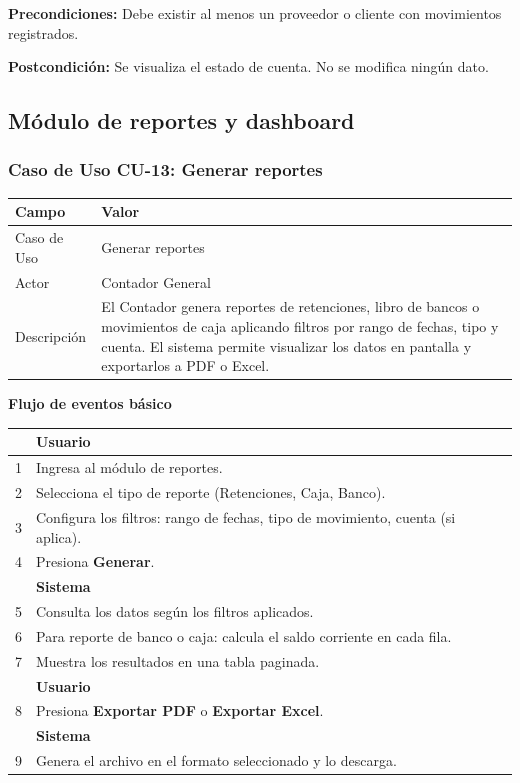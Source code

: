 \documentclass[stu]{apa7}
\begin{document}
\vspace{0.3cm}

\textbf{Precondiciones:} Debe existir al menos un proveedor o cliente con movimientos registrados.

\textbf{Postcondición:} Se visualiza el estado de cuenta. No se modifica ningún dato.

\newpage

\subsection{Módulo de reportes y dashboard}

\subsubsection{Caso de Uso CU-13: Generar reportes}

\begin{tabularx}{\textwidth}{|l|X|}
\hline
\rowcolor[gray]{0.9}
\textbf{Campo} & \textbf{Valor} \\
\hline
Caso de Uso & Generar reportes \\
\hline
Actor & Contador General \\
\hline
Descripción & El Contador genera reportes de retenciones, libro de bancos o movimientos de caja aplicando filtros por rango de fechas, tipo y cuenta. El sistema permite visualizar los datos en pantalla y exportarlos a PDF o Excel. \\
\hline
\end{tabularx}

\vspace{0.3cm}

\textbf{Flujo de eventos básico}

\begin{tabularx}{\textwidth}{|c|X|}
\hline
& \textbf{Usuario} \\
\hline
1 & Ingresa al módulo de reportes. \\
\hline
2 & Selecciona el tipo de reporte (Retenciones, Caja, Banco). \\
\hline
3 & Configura los filtros: rango de fechas, tipo de movimiento, cuenta (si aplica). \\
\hline
4 & Presiona \textbf{Generar}. \\
\hline
& \textbf{Sistema} \\
\hline
5 & Consulta los datos según los filtros aplicados. \\
\hline
6 & Para reporte de banco o caja: calcula el saldo corriente en cada fila. \\
\hline
7 & Muestra los resultados en una tabla paginada. \\
\hline
& \textbf{Usuario} \\
\hline
8 & Presiona \textbf{Exportar PDF} o \textbf{Exportar Excel}. \\
\hline
& \textbf{Sistema} \\
\hline
9 & Genera el archivo en el formato seleccionado y lo descarga. \\
\hline
\end{tabularx}
\end{document}
